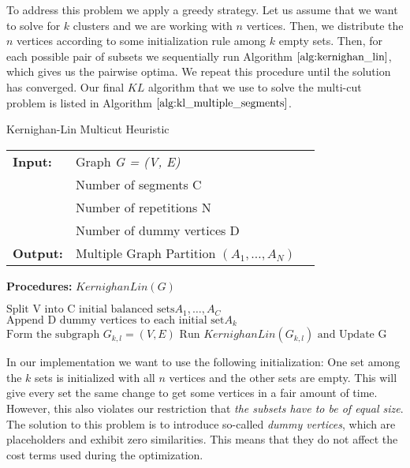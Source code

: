 To address this problem we apply a greedy strategy. Let us assume that we want to solve for $k$ clusters and we are working with $n$ vertices. Then, we distribute the $n$ vertices according to some initialization rule among $k$ empty sets. Then, for each possible pair of subsets we sequentially run Algorithm $\ref{alg:kernighan_lin}$, which gives us the pairwise optima. We repeat this procedure until the solution has converged. Our final $KL$ algorithm that we use to solve the multi-cut problem is listed in Algorithm $\ref{alg:kl_multiple_segments}$.
\begin{algorithm}[H]
\caption{Kernighan-Lin Multicut Heuristic}
\begin{table}[H]
  \begin{tabular}{@{}lll@{}}
    \textbf{Input:} & Graph \emph{G = (V, E)} \\
        & Number of segments C \\
    & Number of repetitions N  \\
    & Number of dummy vertices D \\
	\textbf{Output:} & Multiple Graph Partition $\left( A_1,\dots, A_N \right)$ 
  \end{tabular} 
\end{table}
\textbf{Procedures:} $KernighanLin(G)$  \\
\setlength{\fboxrule}{0pt} 
\begin{boxedminipage}{1.0\textwidth}
  \begin{algorithmic}[1]
  	  \State $\text{Split V into C initial balanced sets} A_1,\dots,A_C$
  	  \State $\text{Append D dummy vertices to each initial set} A_k$ 
        \State $ \text{Form the subgraph } G_{k,l} = (V, E)$
		\State $\text{Run } KernighanLin(G_{k,l}) \text{ and Update G}$
      \EndFor
  \end{algorithmic}
  \end{boxedminipage}
  \vskip1.5pt
\label{alg:kl_multiple_segments}
\end{algorithm}
In our implementation we want to use the following initialization: One set among the $k$ sets is initialized with all $n$ vertices and the other sets are empty. This will give every set the same change to get some vertices in a fair amount of time. However, this also violates our restriction that \textit{the subsets have to be of equal size}. The solution to this problem is to introduce so-called \textit{dummy vertices}, which are placeholders and exhibit zero similarities. This means that they do not affect the cost terms used during the optimization.

